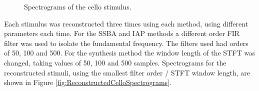 	\begin{figure}[h!]
		\centering
		\quad
		\caption{Spectrograms of the cello stimulus.}
		\label{fig:CelloSpectrograms}
	\end{figure}

	Each stimulus was reconstructed three times using each method, using different parameters each time. For the SSBA
	and IAP methods a different order FIR filter was used to isolate the fundamental frequency. The filters used had
	orders of 50, 100 and 500. For the synthesis method the window length of the STFT was changed, taking values of 50,
	100 and 500 samples. Spectrograms for the reconstructed stimuli, using the smallest filter order / STFT window
	length, are shown in Figure \ref{fig:ReconstructedCelloSpectrograms}.

